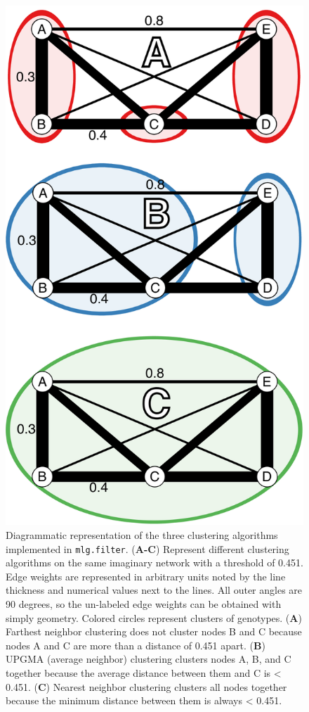 \documentclass[double,11pt]{beavtex}
\begin{document}
  \begin{figure}
  
  {\centering \includegraphics[width=0.5\linewidth]{figure/frontiers/Figure-1} 
  
  }
  
  \caption[Diagrammatic representation of the three clustering algorithms
  implemented in \texttt{mlg.filter}.]{Diagrammatic representation of the three clustering algorithms
  implemented in \texttt{mlg.filter}. (\textbf{A-C}) Represent different
  clustering algorithms on the same imaginary network with a threshold of
  0.451. Edge weights are represented in arbitrary units noted by the line
  thickness and numerical values next to the lines. All outer angles are
  90 degrees, so the un-labeled edge weights can be obtained with simply
  geometry. Colored circles represent clusters of genotypes. (\textbf{A})
  Farthest neighbor clustering does not cluster nodes B and C because
  nodes A and C are more than a distance of 0.451 apart. (\textbf{B})
  UPGMA (average neighbor) clustering clusters nodes A, B, and C together
  because the average distance between them and C is \textless{} 0.451.
  (\textbf{C}) Nearest neighbor clustering clusters all nodes together
  because the minimum distance between them is always \textless{} 0.451.}\label{fig:Figure1}
  \end{figure}
  
\end{document}
